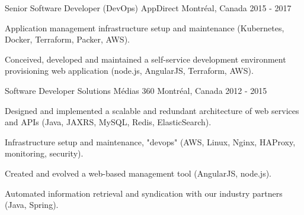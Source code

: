 \begin{cventries}
  \cventry
    {Senior Software Developer (DevOps)} %
    {AppDirect} %
    {Montréal, Canada} %
    {2015 - 2017} %
    {
      \begin{cvitems} %
        \item {Application management infrastructure setup and maintenance (Kubernetes, Docker, Terraform, Packer, AWS).}
        \item {Conceived, developed and maintained a self-service development environment provisioning web application (node.js, AngularJS, Terraform, AWS).}
      \end{cvitems}
    }

  \cventry
    {Software Developer} %
    {Solutions Médias 360} %
    {Montréal, Canada} %
    {2012 - 2015} %
    {
      \begin{cvitems} %
        \item {Designed and implemented a scalable and redundant architecture of web services and APIs (Java, JAXRS, MySQL, Redis, ElasticSearch).}
        \item {Infrastructure setup and maintenance, "devops" (AWS, Linux, Nginx, HAProxy, monitoring, security).}
        \item {Created and evolved a web-based management tool (AngularJS, node.js).}
        \item {Automated information retrieval and syndication with our industry partners (Java, Spring).}
      \end{cvitems}
    }



\end{cventries}
